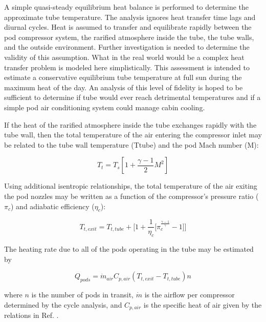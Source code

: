 \documentclass[heading.tex]{subfiles}
\begin{document}
A simple quasi-steady equilibrium heat balance
is performed to determine the approximate tube temperature.
The analysis ignores heat transfer time lags and diurnal cycles.
Heat is assumed to transfer and equilibrate rapidly between the pod compressor system,
the rarified atmosphere inside the tube, the tube walls, and the outside environment.
Further investigation is needed to determine the validity of this assumption.
What in the real world would be a complex heat transfer problem
is modeled here simplistically.
This assessment is intended to estimate a conservative
equilibrium tube temperature at full sun during the maximum heat of the day.
An analysis of this level of fidelity is hoped to be sufficient to determine
if tube would ever reach detrimental temperatures and if a simple pod air conditioning system could manage cabin cooling.


If the heat of the rarified atmosphere inside the tube exchanges rapidly with the tube wall,
then the total temperature of the air entering the compressor inlet
may be related to the tube wall temperature (Ttube) and the pod Mach number (M):

\begin{equation}
T_{t} = T_{s} [1 + \frac{\gamma -1}{2} M^2]
\end{equation}

Using additional isentropic relationships,
the total temperature of the air exiting the pod nozzles may be written as a function
of the compressor’s pressure ratio ($\pi_{c}$) and adiabatic efficiency ($\eta_{c}$):

\begin{equation}
T_{t,exit} = T_{t,tube} + \Bigg[ 1 + \frac{1}{\eta_{c}} \Big[ \pi_{c}^{\frac{\gamma-1}{\gamma}}- 1 \Big] \Bigg]
\end{equation}

The heating rate due to all of the pods operating in the tube may be estimated by

\begin{equation}
{Q}_{pods}= \dot{m}_{air} C_{p,air} (T_{t,exit} - T_{t,tube}) n
\end{equation}

where $n$ is the number of pods in transit,
$\dot{m}$ is the airflow per compressor determined by the cycle analysis,
and $C_{p,air}$ is the specific heat of air given by the relations in Ref. \cite{Clausing}. 
\end{document}
